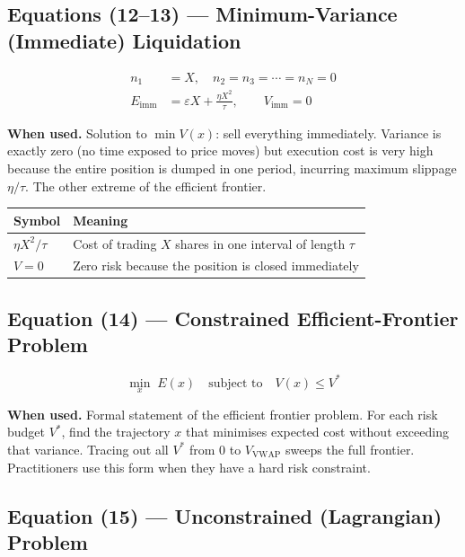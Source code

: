 \documentclass[11pt,a4paper]{article}
\begin{document}
\subsection*{Equations (12--13) — Minimum-Variance (Immediate) Liquidation}

\begin{align}
  n_1 &= X, \quad n_2 = n_3 = \cdots = n_N = 0 \\[4pt]
  E_{\mathrm{imm}} &= \varepsilon X + \frac{\eta X^2}{\tau}, \qquad V_{\mathrm{imm}} = 0
\end{align}

\textbf{When used.} Solution to $\min V(x)$: sell everything immediately.  Variance is
exactly zero (no time exposed to price moves) but execution cost is very high because the
entire position is dumped in one period, incurring maximum slippage $\eta/\tau$.  The
other extreme of the efficient frontier.

\begin{center}
\begin{tabular}{@{}L{3.5cm}L{10cm}@{}}
\toprule
\textbf{Symbol} & \textbf{Meaning} \\
\midrule
$\eta X^2/\tau$ & Cost of trading $X$ shares in one interval of length $\tau$ \\
$V=0$ & Zero risk because the position is closed immediately \\
\bottomrule
\end{tabular}
\end{center}

\subsection*{Equation (14) — Constrained Efficient-Frontier Problem}

\begin{equation}
  \min_x\; E(x) \quad \text{subject to}\quad V(x) \leq V^*
\end{equation}

\textbf{When used.} Formal statement of the efficient frontier problem.  For each risk
budget $V^*$, find the trajectory $x$ that minimises expected cost without exceeding that
variance.  Tracing out all $V^*$ from $0$ to $V_{\mathrm{VWAP}}$ sweeps the full
frontier.  Practitioners use this form when they have a hard risk constraint.

\subsection*{Equation (15) — Unconstrained (Lagrangian) Problem}
\end{document}
